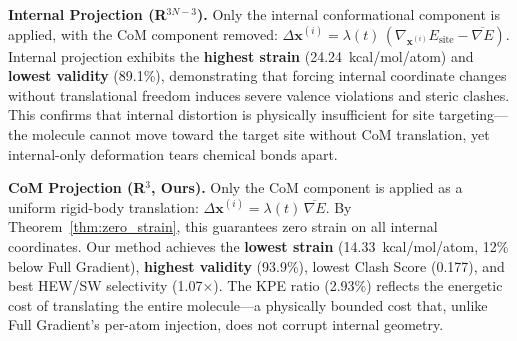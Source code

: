 \documentclass{article}
\begin{document}
\textbf{Internal Projection (R$^{3N-3}$).}
Only the internal conformational component is applied, with the CoM
component removed: $\Delta\bm{x}^{(i)} = \lambda(t)\,(\nabla_{\bm{x}^{(i)}}
E_{\text{site}} - \overline{\nabla E})$.  Internal projection exhibits the
\textbf{highest strain} (24.24~kcal/mol/atom) and \textbf{lowest validity}
(89.1\%), demonstrating that forcing internal coordinate changes without
translational freedom induces severe valence violations and steric clashes.
This confirms that internal distortion is physically insufficient for site
targeting---the molecule cannot move toward the target site without CoM
translation, yet internal-only deformation tears chemical bonds apart.

\textbf{CoM Projection (R$^3$, Ours).}
Only the CoM component is applied as a uniform rigid-body translation:
$\Delta\bm{x}^{(i)} = \lambda(t)\,\overline{\nabla E}$.  By
Theorem~\ref{thm:zero_strain}, this guarantees zero strain on all internal
coordinates.  Our method achieves the \textbf{lowest strain} (14.33~kcal/mol/atom,
12\% below Full Gradient), \textbf{highest validity} (93.9\%), lowest
Clash Score (0.177), and best HEW/SW selectivity (1.07$\times$).  The KPE
ratio (2.93\%) reflects the energetic cost of translating the entire
molecule---a physically bounded cost that, unlike Full Gradient's per-atom
injection, does not corrupt internal geometry.
\end{document}
